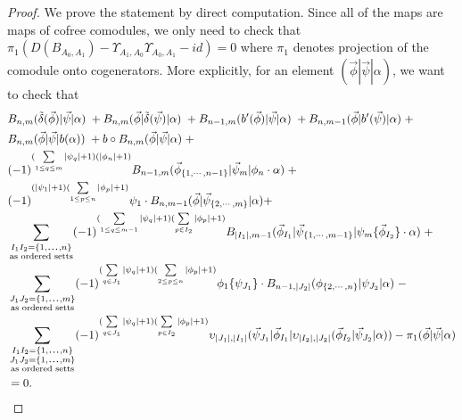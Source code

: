 \begin{proof}
We prove the statement by direct computation. 
Since all of the maps are maps of cofree comodules, 
we only need to check that $\pi_1(D(B_{A_0,A_1}) - 
\Upsilon_{A_1,A_0}\Upsilon_{A_0,A_1} - id) = 0$ 
where $\pi_1$ denotes projection of the comodule 
onto cogenerators. More explicitly, for an element 
$(\vec{\phi}|\vec{\psi}|\alpha)$, we want to check that
\begin{equation} \label{eq:upsilon_homotopy}
\begin{aligned}
&B_{n, m} ( \tilde{\delta}(\vec{\phi}) | \vec{\psi} | \alpha ) \; + 
B_{n, m} ( \vec{\phi} | \tilde{\delta}(\vec{\psi}) | \alpha ) \; + 
B_{n-1, m} ( b^\prime(\vec{\phi}) | \vec{\psi} | \alpha ) \; + 
B_{n, m-1} ( \vec{\phi} | b^\prime(\vec{\psi}) | \alpha ) \; + \\
&B_{n, m} ( \vec{\phi} | \vec{\psi} | b(\alpha) ) \; + 
b \circ B_{n, m} ( \vec{\phi} | \vec{\psi} | \alpha ) \; + \\
%
& (-1)^{(\sum \limits_{1 \leq q \leq m}|\psi_q|+1)(|\phi_n|+1)}
B_{n-1, m}(\vec{\phi}_{\{1,\cdots, n-1\}} |\vec{\psi}_{m} | \phi_{n} \cdot \alpha) \; + \\
%
& (-1)^{(|\psi_1|+1)(\sum \limits_{1 \leq p \leq n}|\phi_p|+1)}
\psi_1 \cdot B_{n,m-1} ( \vec{\phi} | \vec{\psi}_{\{2,\cdots, m\}} | \alpha)  + \\ 
%
& \sum \limits_{\substack{
    I_1I_2 = \{1,\smdots,n\}\\
    \textrm{as ordered setts}}}
(-1)^{(\sum \limits_{1 \leq q \leq m-1}|\psi_q|+1)(\sum \limits_{p \in I_2}|\phi_p|+1)}
B_{|I_1|, m-1}(\vec{\phi}_{I_1} | \vec{\psi}_{\{1,\cdots, m-1\}} | \psi_{m} \{\vec{\phi}_{I_2}\}\cdot \alpha ) \; + \\
%
& \sum \limits_{\substack{
    J_1J_2 = \{1,\smdots,m\}\\
    \textrm{as ordered setts}}}
(-1)^{(\sum \limits_{q \in J_1}|\psi_q|+1)(\sum \limits_{2 \leq p \leq n}|\phi_p|+1)}
\phi_1 \{ \psi_{J_1}\} \cdot B_{n-1, |J_2|}(\phi_{\{2,\cdots , n\}} | \psi_{J_2} | \alpha ) \; - \\
%
& \sum \limits_{\substack{
    I_1I_2 = \{1,\smdots,n\}\\
    J_1J_2 = \{1,\smdots,m\}\\
    \textrm{as ordered setts}}}
(-1)^{(\sum \limits_{q \in J_1}|\psi_q|+1)(\sum \limits_{p \in I_2}|\phi_p|+1)}
\upsilon_{|J_1|, |I_1|} (\vec{\psi}_{J_1} | \vec{\phi}_{I_1} | \upsilon_{|I_2|, |J_2|} (\vec{\phi}_{I_2} | \vec{\psi}_{J_2} | \alpha ))  - \pi_1(\vec{\phi} | \vec{\psi} | \alpha) \\
&= 0.
\end{aligned}
\end{equation}


\end{proof}
